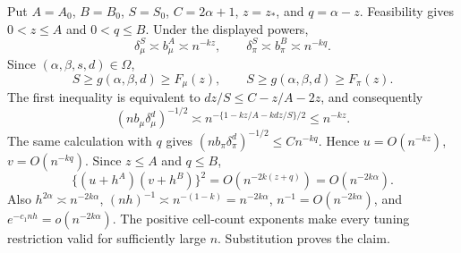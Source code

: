 Put \(A=A_0\), \(B=B_0\), \(S=S_0\), \(C=2\alpha+1\), \(z=z_*\), and \(q=\alpha-z\). Feasibility gives \(0<z\le A\) and \(0<q\le B\). Under the displayed powers,
\[
\delta_\mu^S\asymp b_\mu^A\asymp n^{-kz},
\qquad
\delta_\pi^S\asymp b_\pi^B\asymp n^{-kq}.
\]
Since \((\alpha,\beta,s,d)\in\Omega\),
\[
S\ge g(\alpha,\beta,d)\ge F_\mu(z),
\qquad
S\ge g(\alpha,\beta,d)\ge F_\pi(z).
\]
The first inequality is equivalent to \(dz/S\le C-z/A-2z\), and consequently
\[
(nb_\mu\delta_\mu^d)^{-1/2}
\asymp n^{-\{1-kz/A-kdz/S\}/2}
\le n^{-kz}.
\]
The same calculation with \(q\) gives \((nb_\pi\delta_\pi^d)^{-1/2}\le Cn^{-kq}\). Hence \(u=O(n^{-kz})\), \(v=O(n^{-kq})\). Since \(z\le A\) and \(q\le B\),
\[
\{(u+h^A)(v+h^B)\}^2
=O(n^{-2k(z+q)})=O(n^{-2k\alpha}).
\]
Also \(h^{2\alpha}\asymp n^{-2k\alpha}\), \((nh)^{-1}\asymp n^{-(1-k)}=n^{-2k\alpha}\), \(n^{-1}=O(n^{-2k\alpha})\), and \(e^{-c_1nh}=o(n^{-2k\alpha})\). The positive cell-count exponents make every tuning restriction valid for sufficiently large \(n\). Substitution proves the claim.